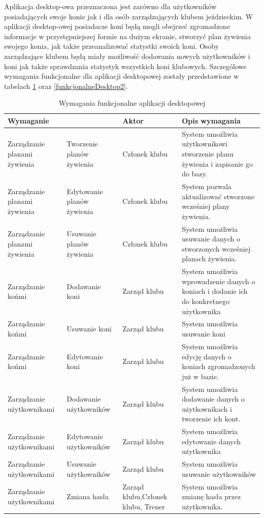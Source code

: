 \documentclass[12pt,twoside]{report}
\begin{document}
Aplikacja desktop-owa przeznaczona jest zarówno dla użytkowników posiadających swoje konie jak i dla osób zarządzających klubem jeździeckim. W aplikacji desktop-owej posiadacze koni będą mogli obejrzeć zgromadzone informacje w przystępniejszej formie na dużym ekranie, stworzyć plan żywienia swojego konia, jak także przeanalizować statystki swoich koni. Osoby zarządzające klubem będą miały możliwość dodawania nowych użytkowników i koni jak także sprawdzania statystyk wszystkich koni klubowych. Szczególowe wymagania funkcjonalne dla aplikacji desktopowej zostały przedstawione w tabelach \ref{funkcjonalneDesktop1} oraz \ref{funkcjonalneDesktop2}.
\begin{table}[H]
	\centering
	\begin{tabular}{|p{3cm}|p{3cm}|p{4cm}|p{6cm}|}			
		\hline
		\multicolumn{2}{|l|}{Wymaganie} & Aktor & Opis wymagania\\
		\hline
		Zarządzanie planami żywienia & Tworzenie planów żywienia  & Członek klubu & System umożliwia użytkownikowi stworzenie planu żywienia i zapisanie go do bazy.\\		
		\hline
		Zarządzanie planami żywienia & Edytowanie planów żywienia  & Członek klubu & System pozwala aktualizować stworzone wcześniej plany żywienia.\\
		\hline
		Zarządzanie planami żywienia & Usuwanie planów żywienia  & Członek klubu & System umożliwia usuwanie danych o stworzonych wcześniej planach żywienia.\\
		\hline
		Zarządzanie końmi& Dodawanie koni & Zarząd klubu & System umożliwia wprowadzenie danych o koniach i dodanie ich do konkretnego użytkownika\\ 		
		\hline
		Zarządzanie końmi& Usuwanie koni & Zarząd klubu & System umożliwia usuwanie koni\\ 		
		\hline
		Zarządzanie końmi& Edytowanie koni & Zarząd klubu & System umożliwia edycję danych o koniach zgromadzonych już w bazie.\\ 
		\hline
		Zarządzanie użytkownikami & Dodawanie użytkowników & Zarząd klubu & System umożliwia dodawanie danych o użytkownikach i tworzenie ich kont.\\		
		\hline
		Zarządzanie użytkownikami & Edytowanie użytkowników & Zarząd klubu & System umożliwia edytowanie danych użytkownika\\		
		\hline
		Zarządzanie użytkownikami & Usuwanie użytkowników & Zarząd klubu & System umożliwia usuwanie użytkowników\\
		\hline
		Zarządzanie użytkownikami & Zmiana hasła & Zarząd klubu,Członek klubu, Trener& System umożliwia zmianę hasła przez użytkownika.\\
		\hline
		
	\end{tabular}
\caption{Wymagania funkcjonalne aplikacji desktopowej}
\label{funkcjonalneDesktop1}
\end{table}
\end{document}
